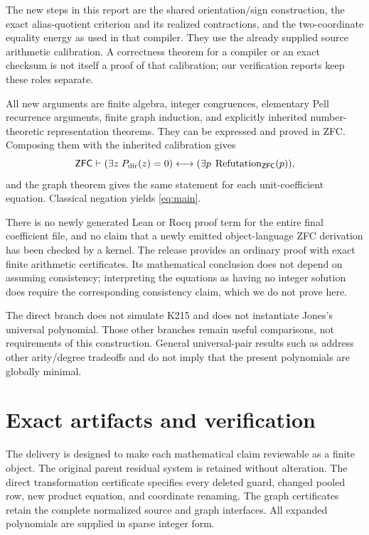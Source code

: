 \documentclass[11pt,letterpaper]{article}
\theoremstyle{definition}\newtheorem{definition}[theorem]{Definition}
\theoremstyle{remark}\newtheorem{remark}[theorem]{Remark}
\begin{document}
The new steps in this report are the shared orientation/sign construction,
the exact alias-quotient criterion and its realized contractions, and the
two-coordinate equality energy as used in that compiler. They use the
already supplied source arithmetic calibration. A correctness theorem for
a compiler or an exact checksum is not itself a proof of that calibration;
our verification reports keep these roles separate.

All new arguments are finite algebra, integer congruences, elementary
Pell recurrence arguments, finite graph induction, and explicitly inherited
number-theoretic representation theorems. They can be expressed and proved
in ZFC. Composing them with the inherited calibration gives
\[
 \mathsf{ZFC}\vdash
   (\exists z\;P_{\mathrm{dir}}(z)=0)
   \longleftrightarrow
   (\exists p\;\operatorname{Refutation}_{\mathsf{ZFC}}(p)),
\]
and the graph theorem gives the same statement for each unit-coefficient
equation. Classical negation yields \eqref{eq:main}.

There is no newly generated Lean or Rocq proof term for the entire final
coefficient file, and no claim that a newly emitted object-language ZFC
derivation has been checked by a kernel. The release provides an ordinary
proof with exact finite arithmetic certificates. Its mathematical conclusion
does not depend on assuming consistency; interpreting the equations as
having no integer solution does require the corresponding consistency
claim, which we do not prove here.

The direct branch does not simulate K215 and does not instantiate Jones's
universal polynomial. Those other branches remain useful comparisons, not
requirements of this construction. General universal-pair results such as
\cite{bayer,jones} address other arity/degree tradeoffs and do not imply
that the present polynomials are globally minimal.

\section{Exact artifacts and verification}
\label{sec:verification}

The delivery is designed to make each mathematical claim reviewable as a
finite object. The original parent residual system is retained without
alteration. The direct transformation certificate specifies every deleted
guard, changed pooled row, new product equation, and coordinate renaming.
The graph certificates retain the complete normalized source and graph
interfaces. All expanded polynomials are supplied in sparse integer form.
\end{document}
